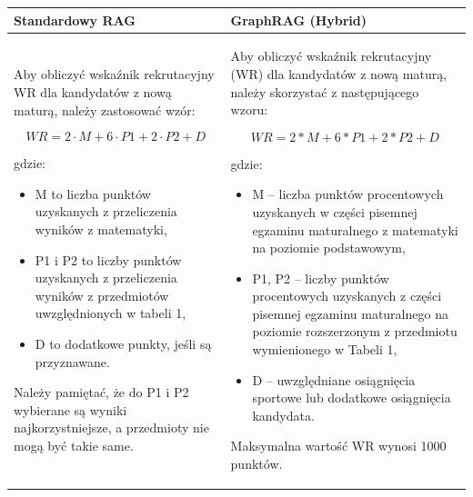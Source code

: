 \noindent
\begin{tabularx}{\textwidth}{@{} XX @{}}
    \toprule
    \textbf{Standardowy RAG} & \textbf{GraphRAG (Hybrid)} \\
    \midrule
    \small 
    Aby obliczyć wskaźnik rekrutacyjny WR dla kandydatów z nową maturą, należy zastosować wzór:
    
    $$WR = 2 \cdot M + 6 \cdot P1 + 2 \cdot P2 + D$$
    
    gdzie:
    \begin{itemize}
        \item M to liczba punktów uzyskanych z przeliczenia wyników z matematyki,
        \item P1 i P2 to liczby punktów uzyskanych z przeliczenia wyników z przedmiotów uwzględnionych w tabeli 1,
        \item D to dodatkowe punkty, jeśli są przyznawane.
    \end{itemize}
    
    Należy pamiętać, że do P1 i P2 wybierane są wyniki najkorzystniejsze, a przedmioty nie mogą być takie same.
    & 
    \small 
    Aby obliczyć wskaźnik rekrutacyjny (WR) dla kandydatów z nową maturą, należy skorzystać z następującego wzoru:

    $$WR = 2 * M + 6 * P1 + 2 * P2 + D$$

    gdzie:
    \begin{itemize}
        \item M – liczba punktów procentowych uzyskanych w części pisemnej egzaminu maturalnego z matematyki na poziomie podstawowym,
        \item P1, P2 – liczby punktów procentowych uzyskanych z części pisemnej egzaminu maturalnego na poziomie rozszerzonym z przedmiotu wymienionego w Tabeli 1,
        \item D – uwzględniane osiągnięcia sportowe lub dodatkowe osiągnięcia kandydata.
    \end{itemize}
    
    Maksymalna wartość WR wynosi 1000 punktów. \\
    \bottomrule
\end{tabularx}

